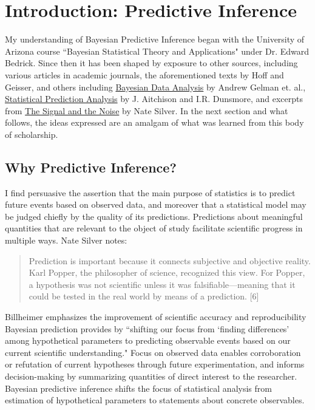 \documentclass[12pt, a4paper]{article}
\begin{document}

\section{Introduction:  Predictive Inference}

My understanding of Bayesian Predictive Inference began with the University of Arizona course ``Bayesian Statistical Theory and Applications" under Dr. Edward Bedrick.  Since then it has been shaped by exposure to other sources, including various articles in academic journals, the aforementioned texts by Hoff and Geisser, and others including \underline{Bayesian Data Analysis} by Andrew Gelman et. al., \underline{Statistical Prediction Analysis} by J. Aitchison and I.R. Dunsmore, and excerpts from \underline{The Signal and the Noise} by Nate Silver.  In the next section and what follows, the ideas expressed are an amalgam of what was learned from this body of scholarship.

  \subsection{Why Predictive Inference?}


I find persuasive the assertion that the main purpose of statistics is to predict future events based on observed data, and moreover that a statistical model may be judged chiefly by the quality of its predictions.  Predictions about meaningful quantities that are relevant to the object of study facilitate scientific progress in multiple ways.  Nate Silver notes:

\begin{quote}
Prediction is important because it connects subjective and objective reality. Karl Popper, the philosopher of science, recognized this view. For Popper, a hypothesis was not scientific unless it was falsifiable—meaning that it could be tested in the real world by means of a prediction. [6]
\end{quote}

\noindent Billheimer emphasizes the improvement of scientific accuracy and reproducibility Bayesian prediction provides by ``shifting our focus from `finding differences' among hypothetical parameters to predicting observable events based on our current scientific understanding." Focus on observed data enables corroboration or refutation of current hypotheses through future experimentation, and informs decision-making by summarizing quantities of direct interest to the researcher.  Bayesian predictive inference shifts the focus of statistical analysis from estimation of hypothetical parameters to statements about concrete observables.\\
\end{document}
